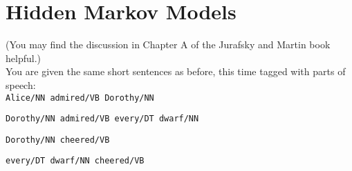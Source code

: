 \documentclass[11pt,letterpaper]{article}
\begin{document}
\section{Hidden Markov Models}

(You may find the discussion in Chapter A of the Jurafsky and Martin book helpful.)\\

\noindent You are given the same short sentences as before, this time tagged with parts of speech:\\

\texttt{Alice/NN admired/VB Dorothy/NN}

\texttt{Dorothy/NN admired/VB every/DT dwarf/NN}

\texttt{Dorothy/NN cheered/VB}

\texttt{every/DT dwarf/NN cheered/VB}
\end{document}
